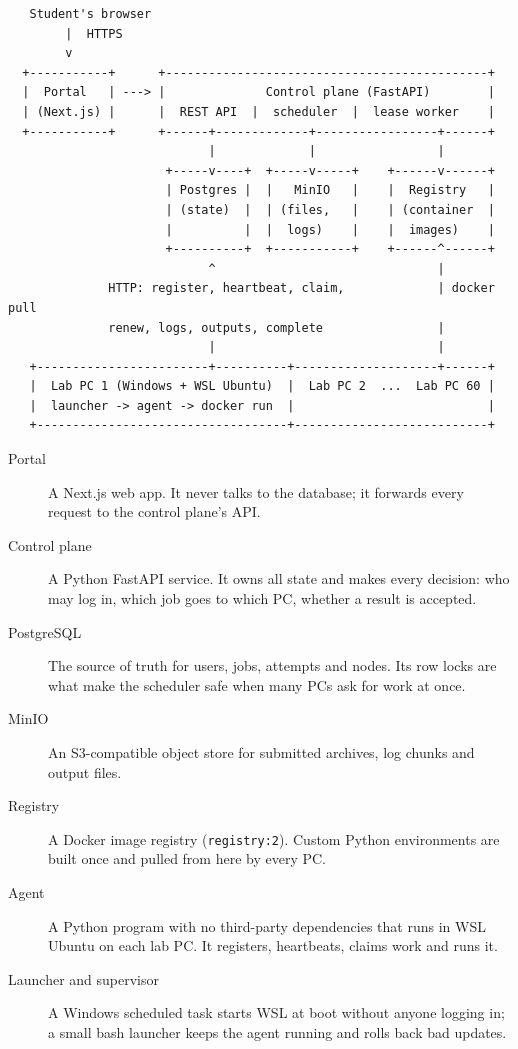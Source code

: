 \begin{verbatim}
   Student's browser
        |  HTTPS
        v
  +-----------+      +---------------------------------------------+
  |  Portal   | ---> |              Control plane (FastAPI)        |
  | (Next.js) |      |  REST API  |  scheduler  |  lease worker    |
  +-----------+      +------+-------------+-----------------+------+
                            |             |                 |
                      +-----v----+  +-----v-----+    +------v------+
                      | Postgres |  |   MinIO   |    |  Registry   |
                      | (state)  |  | (files,   |    | (container  |
                      |          |  |  logs)    |    |  images)    |
                      +----------+  +-----------+    +------^------+
                            ^                               |
              HTTP: register, heartbeat, claim,             | docker pull
              renew, logs, outputs, complete                |
                            |                               |
   +------------------------+----------+--------------------+------+
   |  Lab PC 1 (Windows + WSL Ubuntu)  |  Lab PC 2  ...  Lab PC 60 |
   |  launcher -> agent -> docker run  |                           |
   +-----------------------------------+---------------------------+
\end{verbatim}

\begin{description}
\item[Portal] A Next.js web app. It never talks to the database; it forwards
  every request to the control plane's API.
\item[Control plane] A Python FastAPI service. It owns all state and makes
  every decision: who may log in, which job goes to which PC, whether a result
  is accepted.
\item[PostgreSQL] The source of truth for users, jobs, attempts and nodes.
  Its row locks are what make the scheduler safe when many PCs ask for work at
  once.
\item[MinIO] An S3-compatible object store for submitted archives, log
  chunks and output files.
\item[Registry] A Docker image registry (\texttt{registry:2}). Custom Python
  environments are built once and pulled from here by every PC.
\item[Agent] A Python program with no third-party dependencies that runs in
  WSL Ubuntu on each lab PC. It registers, heartbeats, claims work and runs it.
\item[Launcher and supervisor] A Windows scheduled task starts WSL at boot
  without anyone logging in; a small bash launcher keeps the agent running and
  rolls back bad updates.
\end{description}

